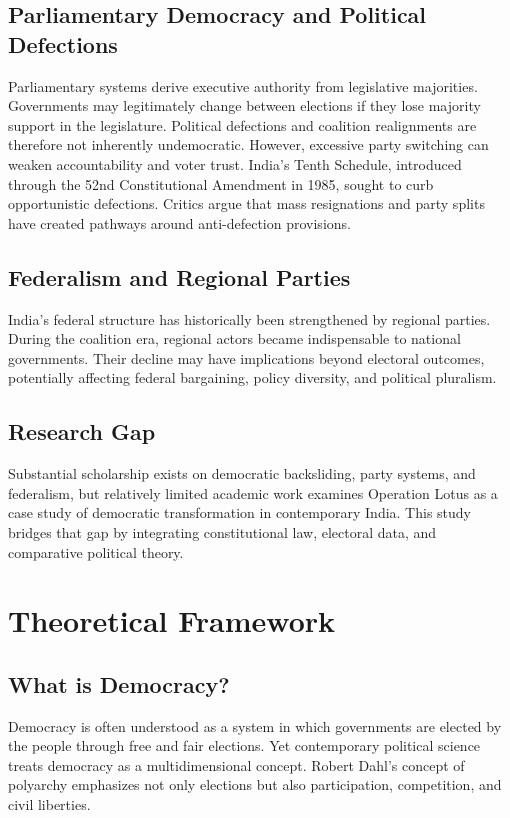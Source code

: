 \documentclass[11pt]{article}
\begin{document}
\subsection{Parliamentary Democracy and Political Defections}
Parliamentary systems derive executive authority from legislative majorities. Governments may legitimately change between elections if they lose majority support in the legislature. Political defections and coalition realignments are therefore not inherently undemocratic. However, excessive party switching can weaken accountability and voter trust. India's Tenth Schedule, introduced through the 52nd Constitutional Amendment in 1985, sought to curb opportunistic defections. Critics argue that mass resignations and party splits have created pathways around anti-defection provisions.

\subsection{Federalism and Regional Parties}
India's federal structure has historically been strengthened by regional parties. During the coalition era, regional actors became indispensable to national governments. Their decline may have implications beyond electoral outcomes, potentially affecting federal bargaining, policy diversity, and political pluralism.

\subsection{Research Gap}
Substantial scholarship exists on democratic backsliding, party systems, and federalism, but relatively limited academic work examines Operation Lotus as a case study of democratic transformation in contemporary India. This study bridges that gap by integrating constitutional law, electoral data, and comparative political theory.

\section{Theoretical Framework}
\subsection{What is Democracy?}
Democracy is often understood as a system in which governments are elected by the people through free and fair elections. Yet contemporary political science treats democracy as a multidimensional concept. Robert Dahl's concept of polyarchy emphasizes not only elections but also participation, competition, and civil liberties.
\end{document}
